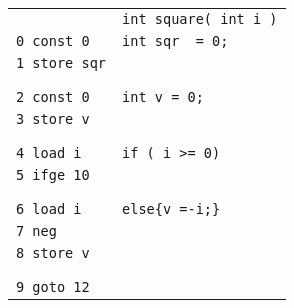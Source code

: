  \begin{figure}[ht!]
\begin{frameit}
  \scriptsize{
  \begin{tabular}{ll}
& \lstinline!int square( int i )!\\
\lstinline!0 const 0!      & \lstinline!int sqr  = 0;! \\
\lstinline!1 store sqr!	   & \\
                           & \\ & \\

\lstinline!2 const 0!      & \lstinline!int v = 0;! \\
\lstinline!3 store v!	   & \\
                           & \\ & \\

\lstinline!4 load i!       & \lstinline!if ( i >= 0)! \\ 
\lstinline!5 ifge 10!	   & \\
 & \\ & \\
\lstinline!6 load i!       & \Myspace \lstinline!else{v =-i;}! \\ 
\lstinline!7 neg!	   & \\
\lstinline!8 store v!	   & \\
                           & \\ & \\
\lstinline!9 goto 12!	   & \\ 


\end{tabular}}
\end{frameit}
\end{figure}
